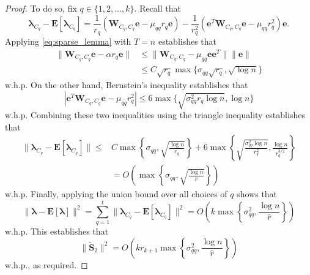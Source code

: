 \documentclass[twoside,11pt]{article}
\newcommand{\E}{\mathbf{E}}
\newcommand{\St}{\bs{\tilde S}}
\newcommand{\e}{\bs {e}}
\newcommand{\bs}{\boldsymbol}
\newcommand{\W}{\bs {W}}
\newcommand{\0}{\bs{0}}
\newcommand{\rbra}[1]{\ensuremath{\left( #1 \right)}} %
\newcommand{\bra}[1]{\ensuremath{\left\{ #1 \right\}}} %
\begin{document}
{\begin{proof}
\newcommand{\bl}{\bs{\lambda}}
To do so, fix $q \in \{1,2,\dots, k\}$. Recall that
\[
	\bl_{C_q} - \E[\bl_{C_q}] = \frac{1}{r_q} ( \W_{C_q, C_q} \e - \mu_{qq} r_q \e )
		- \frac{1}{r_q^2} (\e^T \W_{C_q, C_q} \e - \mu_{qq} r_q^2) \e.
\]
Applying \eqref{eq:sparse_lemma} with $T = n$ establishes that
\begin{align*}
	\| \W_{C_q, C_q} \e - \alpha r_q \e \| &\le  \|\W_{C_q, C_q}  - \mu_{qq} \e\e^T \| \|\e\| \\
	& \le C \sqrt{r_q} \max\{ \sigma_{qq} \sqrt{ r_q}, \sqrt{\log n} \}
\end{align*}
w.h.p.
On the other hand, Bernstein's inequality establishes that
\[
	|  \e^T \W_{C_q, C_q} \e - \mu_{qq} r_q^2 | \le 6 \max \{ \sqrt{\sigma_{qq}^2 r_q \log n}, \log n \}
\]
w.h.p.
Combining these two inequalities using the triangle inequality establishes that
\begin{align*}
	\| \bl_{C_q} - \E[\bl_{C_q}] \| \le &C \max \bra{ \sigma_{qq}, \sqrt{\frac{\log n}{r_q } } }
		+ 6 \max \bra { \sqrt{ \frac{\sigma_{qq}^2 \log n}{r_q^2}}, \frac{\log n}{r_q^{3/2} } } \\
		&= O \rbra{ \max \bra{ \sigma_{qq}, \sqrt{ \frac{ \log n}{\hat r} } } }
\end{align*}
w.h.p.
Finally, applying the union bound over all choices of $q$ shows that
\[
	\| \bl - \E [ \bl ] \|^2 = \sum_{q=1}^t \| \bl_{C_q} - \E[\bl_{C_q}] \|^2
		= O \rbra{  k \max \bra{ \sigma_{qq}^2, \frac{\log n}{\hat r} } }
\]
w.h.p.
This establishes that
\[
	\|\St_2\|^2 = O\rbra{k r_{k+1} \max \bra{ \sigma_{qq}^2, \frac{\log n}{\hat r} } }
\]
w.h.p., as required.
\end{proof}




%

\begingroup
\raggedright


\endgroup
\end{document}
